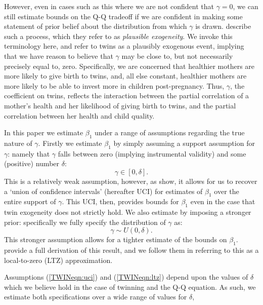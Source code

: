\documentclass[subeqn]{article}
\begin{document}
\begin{spacing}{1.4}
However, even in cases such as this where we are not confident that $\gamma=0$,
we can still estimate bounds on the Q-Q tradeoff if we are confident in making
some statement of prior belief about the distribution from which $\gamma$ is 
drawn.  \citet{Conleyetal2012} describe such a process, which they refer to as 
\emph{plausible exogeneity}.  We invoke this terminology here, and refer to 
twins as a plausibly exogenous event, implying that we have reason to believe 
that $\gamma$ may be close to, but not necessarily precisely equal to, zero.
Specifically, we are concerned that healthier mothers are more likely to give
birth to twins, and, all else constant, healthier mothers are more likely to be 
able to invest more in children post-pregnancy.  Thus, $\gamma$, the coefficient 
on twins, reflects the interaction between the partial correlation of a mother's 
health and her likelihood of giving birth to twins, and the partial correlation 
between her health and child quality.

In this paper we estimate $\beta_1$ under a range of assumptions regarding the
true nature of $\gamma$.  Firstly we estimate $\beta_1$ by simply assuming a
support assumption for $\gamma$: namely that $\gamma$ falls between zero (implying 
instrumental validity) and some (positive) number $\delta$:
\begin{equation}
\label{TWINeqn:uci}
\gamma \in [0,\delta].
\end{equation}
This is a relatively weak assumption, however, as \citet{Conleyetal2012} show,
it allows for us to recover a `union of confidence intervals' (hereafter UCI) 
for estimates of $\beta_1$ over the entire support of $\gamma$.  This UCI, then, 
provides bounds for $\beta_1$ even in the case that twin exogeneity does not 
strictly hold. We also estimate by imposing a stronger prior: specifically we 
fully specify the distribution of $\gamma$ as:
\begin{equation}
\label{TWINeqn:ltz}
\gamma \sim U(0,\delta).
\end{equation}
This stronger assumption allows for a tighter estimate of the bounds on 
$\beta_1$.  \citet{Conleyetal2012} provide a full derivation of this result, and 
we follow them in referring to this as a local-to-zero (LTZ) approximation.

Assumptions (\ref{TWINeqn:uci}) and (\ref{TWINeqn:ltz}) depend upon the values
of $\delta$ which we believe hold in the case of twinning and the Q-Q equation.
As such, we estimate both specifications over a wide range of values for 
$\delta$,  



\end{spacing}
\end{document}
